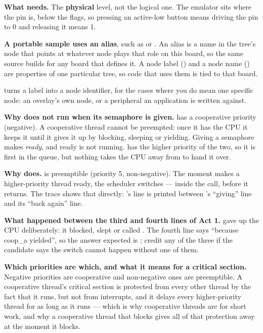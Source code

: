 \textbf{What  needs.} The \textbf{physical} level, not the logical one.
The emulator sits where the pin is, below the flags, so pressing an active-low button means driving
the pin to 0 and releasing it means 1. 

\textbf{A portable sample uses an alias}, such as  or . An alias is a name in
the tree's  node that points at whatever node plays that role on this board, so the
same source builds for any board that defines it. A node label () and a node name
() are properties of one particular tree, so code that uses them is tied to that
board. 

\textbf{} turns a label into a node identifier, for the cases where you do mean
one specific node: an overlay's own node, or a peripheral an application is written against.


\textbf{Why  does not run when its semaphore is given.}  has a cooperative
priority (negative). A cooperative thread cannot be preempted: once it has the CPU it keeps it until
it gives it up by blocking, sleeping or yielding. Giving a semaphore makes 
\emph{ready}, and ready is not running.  has the higher priority of the two, so it is
first in the queue, but nothing takes the CPU away from  to hand it over. 

\textbf{Why  does.}  is preemptible (priority 5, non-negative). The moment
 makes a higher-priority thread ready, the scheduler switches --- inside the
call, before it returns. The trace shows that directly: 's line is printed between
's ``giving'' line and its ``back again'' line. 

\textbf{What happened between the third and fourth lines of Act 1.}  gave up the CPU
deliberately: it blocked, slept or called . The fourth line says ``because coop\_a
yielded'', so the answer expected is ; credit any of the three if the candidate says
the switch cannot happen without one of them. 

\textbf{Which priorities are which, and what it means for a critical section.} Negative priorities
are cooperative and non-negative ones are preemptible. A cooperative thread's critical section is
protected from every other thread by the fact that it runs, but not from interrupts, and it delays
every higher-priority thread for as long as it runs --- which is why cooperative threads are for
short work, and why a cooperative thread that blocks gives all of that protection away at the moment
it blocks. 

